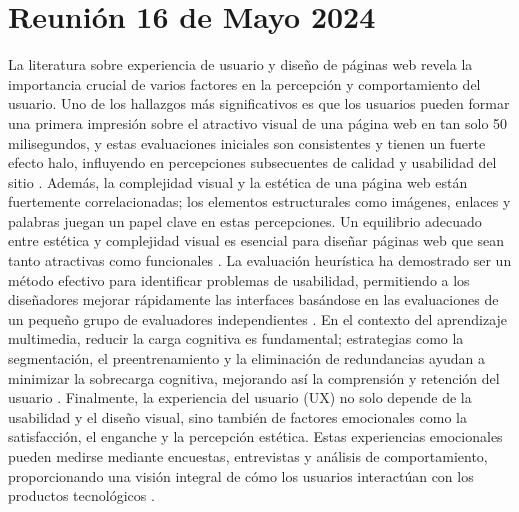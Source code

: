 \section{Reunión 16 de Mayo 2024}

La literatura sobre experiencia de usuario y diseño de páginas web revela la importancia crucial de varios factores en la percepción y comportamiento del usuario. Uno de los hallazgos más significativos es que los usuarios pueden formar una primera impresión sobre el atractivo visual de una página web en tan solo 50 milisegundos, y estas evaluaciones iniciales son consistentes y tienen un fuerte efecto halo, influyendo en percepciones subsecuentes de calidad y usabilidad del sitio \cite{lindgaard2006attention}. Además, la complejidad visual y la estética de una página web están fuertemente correlacionadas; los elementos estructurales como imágenes, enlaces y palabras juegan un papel clave en estas percepciones. Un equilibrio adecuado entre estética y complejidad visual es esencial para diseñar páginas web que sean tanto atractivas como funcionales \cite{michailidou2008visual}. La evaluación heurística ha demostrado ser un método efectivo para identificar problemas de usabilidad, permitiendo a los diseñadores mejorar rápidamente las interfaces basándose en las evaluaciones de un pequeño grupo de evaluadores independientes \cite{nielsen1990heuristic}. En el contexto del aprendizaje multimedia, reducir la carga cognitiva es fundamental; estrategias como la segmentación, el preentrenamiento y la eliminación de redundancias ayudan a minimizar la sobrecarga cognitiva, mejorando así la comprensión y retención del usuario \cite{mayer2003nine}. Finalmente, la experiencia del usuario (UX) no solo depende de la usabilidad y el diseño visual, sino también de factores emocionales como la satisfacción, el enganche y la percepción estética. Estas experiencias emocionales pueden medirse mediante encuestas, entrevistas y análisis de comportamiento, proporcionando una visión integral de cómo los usuarios interactúan con los productos tecnológicos \cite{bargas2011old}.

